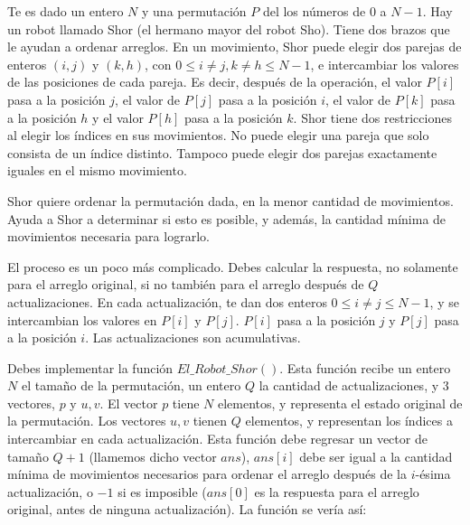 \documentclass[12pt]{scrartcl}
\begin{document}
    
    
    \vspace{10pt}

    

        Te es dado un entero $N$ y una permutación $P$ del los números de $0$ a $N - 1$. Hay un robot llamado Shor (el hermano mayor del robot Sho). Tiene dos brazos que le ayudan a ordenar arreglos. En un movimiento, Shor puede elegir dos parejas de enteros $(i, j)$ y $(k, h)$, con $0 \le i \neq j, k \neq h \le N - 1$, e intercambiar los valores de las posiciones de cada pareja. Es decir, después de la operación, el valor $P[i]$ pasa a la posición $j$, el valor de $P[j]$ pasa a la posición $i$, el valor de $P[k]$ pasa a la posición $h$ y el valor $P[h]$ pasa a la posición $k$. Shor tiene dos restricciones al elegir los índices en sus movimientos. No puede elegir una pareja que solo consista de un índice distinto. Tampoco puede elegir dos parejas exactamente iguales en el mismo movimiento. 

        Shor quiere ordenar la permutación dada, en la menor cantidad de movimientos. Ayuda a Shor a determinar si esto es posible, y además, la cantidad mínima de movimientos necesaria para lograrlo. 
        
        El proceso es un poco más complicado. Debes calcular la respuesta, no solamente para el arreglo original, si no también para el arreglo después de $Q$ actualizaciones. En cada actualización, te dan dos enteros $0 \le i \neq j \le N - 1$, y se intercambian los valores en $P[i]$ y $P[j]$. $P[i]$ pasa a la posición $j$ y $P[j]$ pasa a la posición $i$. Las actualizaciones son acumulativas. 

        

        Debes implementar la función $El\_Robot\_Shor()$. Esta función recibe un entero $N$ el tamaño de la permutación, un entero $Q$ la cantidad de actualizaciones, y 3 vectores, $p$ y $u, v$. El vector $p$ tiene $N$ elementos, y representa el estado original de la permutación. Los vectores $u, v$ tienen $Q$ elementos, y representan los índices a intercambiar en cada actualización. Esta función debe regresar un vector de tamaño $Q + 1$ (llamemos dicho vector $ans$), $ans[i]$ debe ser igual a la cantidad mínima de movimientos necesarios para ordenar el arreglo después de la $i$-ésima actualización, o $-1$ si es imposible ($ans[0]$ es la respuesta para el arreglo original, antes de ninguna actualización).
        La función se vería así:
\end{document}
